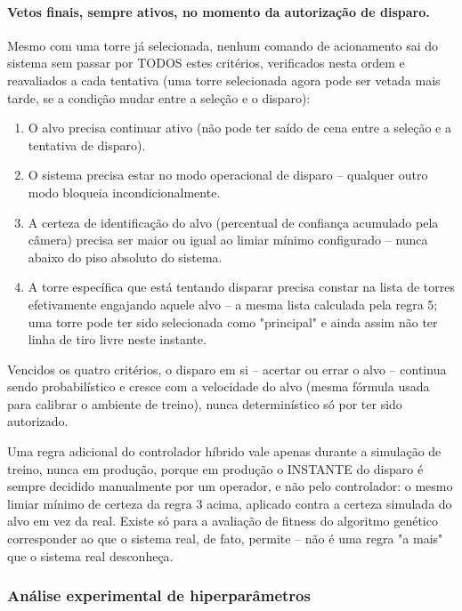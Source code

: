 \documentclass[12pt,a4paper]{article}
\begin{document}
\paragraph{Vetos finais, sempre ativos, no momento da autorização de disparo.} Mesmo com uma torre
já selecionada, nenhum comando de acionamento sai do sistema sem passar por TODOS estes critérios,
verificados nesta ordem e reavaliados a cada tentativa (uma torre selecionada agora pode ser vetada
mais tarde, se a condição mudar entre a seleção e o disparo):
\begin{enumerate}
  \item O alvo precisa continuar ativo (não pode ter saído de cena entre a seleção e a tentativa de
  disparo).
  \item O sistema precisa estar no modo operacional de disparo -- qualquer outro modo
  bloqueia incondicionalmente.
  \item A certeza de identificação do alvo (percentual de confiança acumulado pela câmera) precisa
  ser maior ou igual ao limiar mínimo configurado --
  nunca abaixo do piso absoluto do sistema.
  \item A torre específica que está tentando disparar precisa constar na lista de torres
  efetivamente engajando aquele alvo -- a mesma lista calculada
  pela regra 5; uma torre pode ter sido selecionada como
  "principal" e ainda assim não ter linha de tiro livre neste instante.
\end{enumerate}
Vencidos os quatro critérios, o disparo em si -- acertar ou errar o alvo -- continua sendo
probabilístico e cresce com a velocidade do alvo (mesma fórmula usada para calibrar o ambiente de
treino), nunca determinístico só por ter sido autorizado.

Uma regra adicional do controlador híbrido vale apenas durante a simulação de treino, nunca em
produção, porque em produção o INSTANTE do disparo é sempre decidido manualmente por um operador, e
não pelo controlador: o mesmo limiar mínimo de certeza da regra 3 acima, aplicado contra a certeza
simulada do alvo em vez da real. Existe só para a
avaliação de fitness do algoritmo genético corresponder ao que o sistema real, de fato, permite --
não é uma regra "a mais" que o sistema real desconheça.

\subsubsection{Análise experimental de hiperparâmetros}
\label{sec:experimento-hiperparametros}
\end{document}
